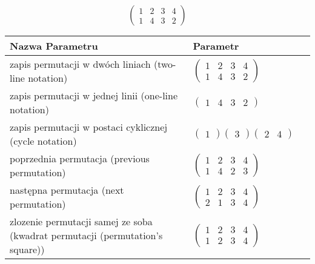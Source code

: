 \documentclass[12pt]{article}
\begin{document}
\subsection{}
\begin{center}
\[
\begin{pmatrix}
	1 & 2 & 3 & 4 \\ 
	1 & 4 & 3 & 2 
\end{pmatrix}
\]

\begin{tabular}{|m{0.6\linewidth}|m{0.4\linewidth}|}
	\hline
	Nazwa Parametru & Parametr \\
	\hline
	zapis permutacji w dwóch liniach (two-line notation) & $\begin{pmatrix} 1 & 2 & 3 & 4 \\ 
1 & 4 & 3 & 2 \end{pmatrix}$ \\ 
	\hline
	zapis permutacji w jednej linii (one-line notation) & $\begin{pmatrix} 1 & 4 & 3 & 2 \end{pmatrix}$ \\ 
	\hline
	zapis permutacji w postaci cyklicznej (cycle notation) & $\begin{pmatrix} 1 \end{pmatrix} \begin{pmatrix} 3 \end{pmatrix} \begin{pmatrix} 2 & 4 \end{pmatrix} $ \\ 
	\hline
	poprzednia permutacja (previous permutation) & $\begin{pmatrix} 1 & 2 & 3 & 4 \\ 
1 & 4 & 2 & 3 \end{pmatrix}$ \\ 
	\hline
	następna permutacja (next permutation) & $\begin{pmatrix} 1 & 2 & 3 & 4 \\ 
2 & 1 & 3 & 4 \end{pmatrix}$ \\ 
	\hline
	zlozenie permutacji samej ze soba (kwadrat permutacji (permutation's square)) & $\begin{pmatrix} 1 & 2 & 3 & 4 \\ 
1 & 2 & 3 & 4 \end{pmatrix}$ \\ 
	\hline
\end{tabular}
\end{center}
\end{document}
